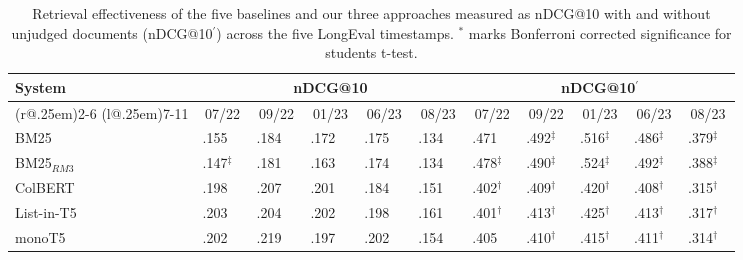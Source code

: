 \begin{table}[t]
\small
\centering
\renewcommand{\tabcolsep}{1.6pt}
\caption{Retrieval effectiveness of the five baselines and our three approaches measured as nDCG@10 with and without unjudged documents (nDCG@10$^{'}$) across the five LongEval timestamps. {\color{red} $^{*}$ marks Bonferroni corrected significance for students t-test.}}
\label{tab:table-results}

\begin{tabular}{@{}l@{}cccccccccc@{}}
    \toprule
    \bfseries System & \multicolumn{5}{c}{\bfseries nDCG@10} & \multicolumn{5}{c}{\bfseries nDCG@10$^{'}$}\\
    \cmidrule(r@{.25em}){2-6}
    \cmidrule(l@{.25em}){7-11}
    
    & 07/22 & 09/22 & 01/23 & 06/23 & 08/23 & 07/22 & 09/22 & 01/23 & 06/23 & 08/23\\
    
    \midrule

BM25 & .155$^{\phantom{\dagger\ddagger}}$ & .184$^{\phantom{\dagger\ddagger}}$ & .172$^{\phantom{\dagger\ddagger}}$ & .175$^{\phantom{\dagger\ddagger}}$ & .134$^{\phantom{\dagger\ddagger}}$ & .471$^{\phantom{\dagger\ddagger}}$ & .492$^{\ddagger\phantom{\dagger}}$ & .516$^{\ddagger\phantom{\dagger}}$ & .486$^{\ddagger\phantom{\dagger}}$ & .379$^{\ddagger\phantom{\dagger}}$ \\
    BM25$_{RM3}$ & .147$^{\ddagger\phantom{\dagger}}$ & .181$^{\phantom{\dagger\ddagger}}$ & .163$^{\phantom{\dagger\ddagger}}$ & .174$^{\phantom{\dagger\ddagger}}$ & .134$^{\phantom{\dagger\ddagger}}$ & .478$^{\ddagger\phantom{\dagger}}$ & .490$^{\ddagger\phantom{\dagger}}$ & .524$^{\ddagger\phantom{\dagger}}$ & .492$^{\ddagger\phantom{\dagger}}$ & .388$^{\ddagger\phantom{\dagger}}$ \\
    ColBERT & .198$^{\phantom{\dagger\ddagger}}$ & .207$^{\phantom{\dagger\ddagger}}$ & .201$^{\phantom{\dagger\ddagger}}$ & .184$^{\phantom{\dagger\ddagger}}$ & .151$^{\phantom{\dagger\ddagger}}$ & .402$^{\dagger\phantom{\ddagger}}$ & .409$^{\dagger\phantom{\ddagger}}$ & .420$^{\dagger\phantom{\ddagger}}$ & .408$^{\dagger\phantom{\ddagger}}$ & .315$^{\dagger\phantom{\ddagger}}$ \\
    List-in-T5 & .203$^{\phantom{\dagger\ddagger}}$ & .204$^{\phantom{\dagger\ddagger}}$ & .202$^{\phantom{\dagger\ddagger}}$ & .198$^{\phantom{\dagger\ddagger}}$ & .161$^{\phantom{\dagger\ddagger}}$ & .401$^{\dagger\phantom{\ddagger}}$ & .413$^{\dagger\phantom{\ddagger}}$ & .425$^{\dagger\phantom{\ddagger}}$ & .413$^{\dagger\phantom{\ddagger}}$ & .317$^{\dagger\phantom{\ddagger}}$ \\
    monoT5 & .202$^{\phantom{\dagger\ddagger}}$ & .219$^{\phantom{\dagger\ddagger}}$ & .197$^{\phantom{\dagger\ddagger}}$ & .202$^{\phantom{\dagger\ddagger}}$ & .154$^{\phantom{\dagger\ddagger}}$ & .405$^{\phantom{\dagger\ddagger}}$ & .410$^{\dagger\phantom{\ddagger}}$ & .415$^{\dagger\phantom{\ddagger}}$ & .411$^{\dagger\phantom{\ddagger}}$ & .314$^{\dagger\phantom{\ddagger}}$ \\
    

\end{tabular}
\end{table}
